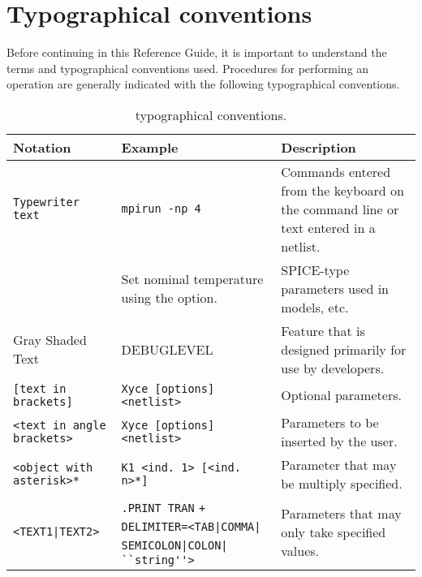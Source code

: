 \section{Typographical conventions}
Before continuing in this Reference Guide, it is important to understand 
the terms and typographical conventions used.  Procedures for performing 
an operation are generally indicated with the following typographical 
conventions.

\begin{table}[htbp]
  \caption{\Xyce{} typographical conventions.}
  \begin{tabularx}{\linewidth}{|Y|Y|Y|}
     \color{white}\bf Notation & \color{white}\bf
    Example & \color{white}\bf Description \\ \hline

    \texttt{Typewriter text} & \texttt{mpirun -np 4}
    & Commands entered
    from the keyboard on the command line or text entered in a netlist. \\
    \hline

     & Set nominal temperature using the
     option. & SPICE-type parameters used in models, etc. \\
    \hline

     Gray Shaded Text &  DEBUGLEVEL
    & Feature that is designed primarily for use by \Xyce{}
    developers. \\ \hline

    \texttt{[text in brackets]} & \texttt{Xyce [options] <netlist>} & Optional parameters. \\ \hline

    \texttt{<text in angle brackets>} & \texttt{Xyce [options] <netlist>} &
    Parameters to be inserted by the user. \\ \hline

    \texttt{<object with asterisk>*} & \texttt{K1 <ind. 1> [<ind. n>*]} &
    Parameter that may be multiply specified. \\ \hline

    \texttt{<TEXT1|TEXT2>}&
    \texttt{.PRINT TRAN}
    \verb-+ DELIMITER=<TAB|COMMA|-
    \verb- SEMICOLON|COLON|-
    \verb- ``string''>- & Parameters that may only take specified values. \\ \hline

  \end{tabularx}
\end{table}

